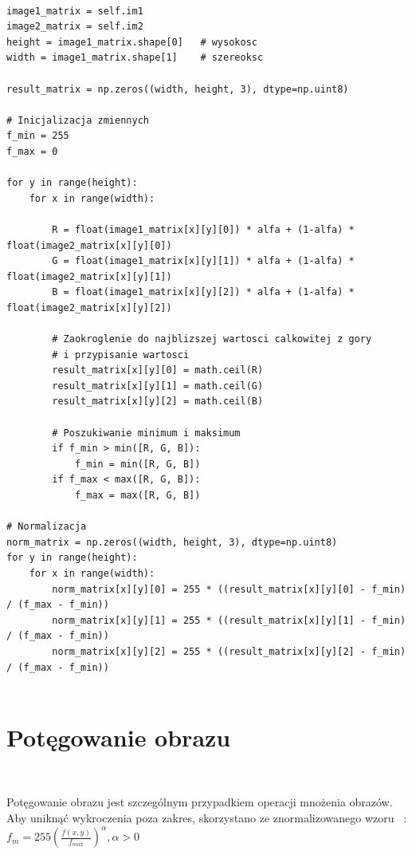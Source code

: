 \documentclass[final,a4paper,openany,12pt]{mwbk}
\begin{document}
\begin{lstlisting}[caption=Mieszanie obrazów barwowych z określonym współczynnikiem]

image1_matrix = self.im1
image2_matrix = self.im2
height = image1_matrix.shape[0]   # wysokosc
width = image1_matrix.shape[1]    # szereoksc

result_matrix = np.zeros((width, height, 3), dtype=np.uint8)

# Inicjalizacja zmiennych
f_min = 255
f_max = 0

for y in range(height):
    for x in range(width):  

        R = float(image1_matrix[x][y][0]) * alfa + (1-alfa) * float(image2_matrix[x][y][0])
        G = float(image1_matrix[x][y][1]) * alfa + (1-alfa) * float(image2_matrix[x][y][1])
        B = float(image1_matrix[x][y][2]) * alfa + (1-alfa) * float(image2_matrix[x][y][2])

        # Zaokroglenie do najblizszej wartosci calkowitej z gory
        # i przypisanie wartosci
        result_matrix[x][y][0] = math.ceil(R)
        result_matrix[x][y][1] = math.ceil(G)
        result_matrix[x][y][2] = math.ceil(B)

        # Poszukiwanie minimum i maksimum                
        if f_min > min([R, G, B]):
            f_min = min([R, G, B])
        if f_max < max([R, G, B]):
            f_max = max([R, G, B])

# Normalizacja
norm_matrix = np.zeros((width, height, 3), dtype=np.uint8)
for y in range(height):
    for x in range(width):
        norm_matrix[x][y][0] = 255 * ((result_matrix[x][y][0] - f_min) / (f_max - f_min))
        norm_matrix[x][y][1] = 255 * ((result_matrix[x][y][1] - f_min) / (f_max - f_min))
        norm_matrix[x][y][2] = 255 * ((result_matrix[x][y][2] - f_min) / (f_max - f_min))


\end{lstlisting}
\newpage

\section{ Potęgowanie obrazu}

\hfill\\
\indent

\begin{center} Potęgowanie obrazu jest szczególnym przypadkiem operacji mnożenia obrazów. Aby uniknąć wykroczenia poza zakres, skorzystano ze znormalizowanego wzoru ~\cite{WykRat}:
		$f_{m} = 255(\frac{f(x,y)}{f_{max}}) ^{\alpha}, \alpha > 0 $
	\end{center}
\end{document}
